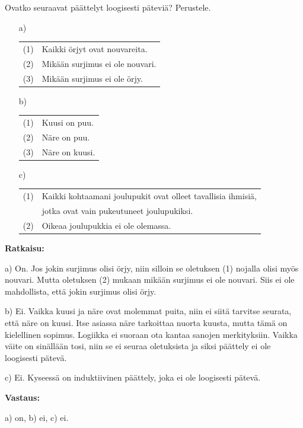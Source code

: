 \begin{esimerkki} Ovatko seuraavat päättelyt loogisesti päteviä? Perustele.

\begin{itemize}
\item[a)] 

\begin{tabular}{ll}
(1) & Kaikki örjyt ovat nouvareita.\\ 
(2) & Mikään surjimus ei ole nouvari.\\ \hline
(3) & Mikään surjimus ei ole örjy.
\end{tabular}

\item[b)]

\begin{tabular}{ll}
(1) & Kuusi on puu.\\ 
(2) & Näre on puu.\\ \hline
(3) & Näre on kuusi.
\end{tabular}

\item[c)]

\begin{tabular}{ll}
(1) & Kaikki kohtaamani joulupukit ovat olleet tavallisia ihmisiä,\\
& jotka ovat vain pukeutuneet joulupukiksi.\\ \hline 
(2) & Oikeaa joulupukkia ei ole olemassa.\\ 
\end{tabular}

\end{itemize}


{\bf Ratkaisu:}

a)  On. Jos jokin surjimus olisi örjy, niin silloin se oletuksen (1) nojalla olisi myös nouvari. Mutta oletuksen (2) mukaan mikään surjimus ei ole nouvari. Siis ei ole
mahdollista, että jokin surjimus olisi örjy. 

b) Ei. Vaikka kuusi ja näre ovat molemmat puita, niin ei siitä tarvitse seurata,   
että näre on kuusi. Itse asiassa näre tarkoittaa nuorta kuusta, mutta tämä on kielellinen sopimus. Logiikka ei suoraan ota kantaa sanojen merkityksiin. Vaikka väite on sinällään tosi, niin se ei seuraa oletuksista ja siksi päättely ei ole loogisesti pätevä.

c) Ei. Kyseessä on induktiivinen päättely, joka ei ole loogisesti pätevä. 

{\bf Vastaus:}

a) on, b) ei, c) ei.
\end{esimerkki}


